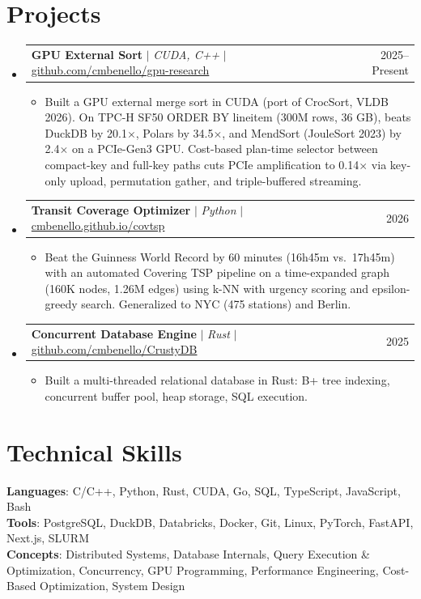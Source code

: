 \documentclass[letterpaper,10pt]{article}
\makeatletter
\newcommand{\resumeItem}[1]{
  \item\small{
    {#1 \vspace{-3pt}}
  }
}
\newcommand{\resumeProjectHeading}[2]{
    \item
    \begin{tabular*}{0.99\textwidth}{l@{\extracolsep{\fill}}r}
      \small#1 & #2 \\
    \end{tabular*}\vspace{-8pt}
}
\newcommand{\resumeSubHeadingListStart}{\begin{itemize}[leftmargin=0.015in, label={}]}
\newcommand{\resumeSubHeadingListEnd}{\end{itemize}}
\newcommand{\resumeItemListStart}{\begin{itemize}[leftmargin=0.15in]}
\newcommand{\resumeItemListEnd}{\end{itemize}\vspace{-7pt}}
\makeatother
\begin{document}
\section{Projects}
    \resumeSubHeadingListStart
      \resumeProjectHeading
          {\textbf{GPU External Sort} $|$ \emph{CUDA, C++} $|$ \small{\href{https://github.com/cmbenello/gpu-research}{github.com/cmbenello/gpu-research}}}{2025--Present}
          \resumeItemListStart
            \resumeItem{Built a GPU external merge sort in CUDA (port of CrocSort, VLDB 2026). On TPC-H SF50 ORDER BY lineitem (300M rows, 36 GB), beats DuckDB by 20.1$\times$, Polars by 34.5$\times$, and MendSort (JouleSort 2023) by 2.4$\times$ on a PCIe-Gen3 GPU. Cost-based plan-time selector between compact-key and full-key paths cuts PCIe amplification to 0.14$\times$ via key-only upload, permutation gather, and triple-buffered streaming.}
          \resumeItemListEnd
      \resumeProjectHeading
          {\textbf{Transit Coverage Optimizer} $|$ \emph{Python} $|$ \small{\href{https://cmbenello.github.io/covtsp}{cmbenello.github.io/covtsp}}}{2026}
          \resumeItemListStart
            \resumeItem{Beat the Guinness World Record by 60 minutes (16h45m vs.\ 17h45m) with an automated Covering TSP pipeline on a time-expanded graph (160K nodes, 1.26M edges) using k-NN with urgency scoring and epsilon-greedy search. Generalized to NYC (475 stations) and Berlin.}
          \resumeItemListEnd
      \resumeProjectHeading
          {\textbf{Concurrent Database Engine} $|$ \emph{Rust} $|$ \small{\href{https://github.com/cmbenello/CrustyDB}{github.com/cmbenello/CrustyDB}}}{2025}
          \resumeItemListStart
            \resumeItem{Built a multi-threaded relational database in Rust: B+ tree indexing, concurrent buffer pool, heap storage, SQL execution.}
          \resumeItemListEnd
    \resumeSubHeadingListEnd

\section{Technical Skills}
 \begin{itemize}[leftmargin=0.015in, label={}]
    \small{\item{
     \textbf{Languages}{: C/C++, Python, Rust, CUDA, Go, SQL, TypeScript, JavaScript, Bash} \\
     \textbf{Tools}{: PostgreSQL, DuckDB, Databricks, Docker, Git, Linux, PyTorch, FastAPI, Next.js, SLURM} \\
     \textbf{Concepts}{: Distributed Systems, Database Internals, Query Execution \& Optimization, Concurrency, GPU Programming, Performance Engineering, Cost-Based Optimization, System Design}
    }}
 \end{itemize}\vspace{-9pt}
\end{document}

